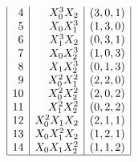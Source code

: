 \begin{table}
$$\begin{array}{|r|r|r|}
4 & X_0^3X_2 & ( 3, 0, 1 )\\
5 & X_0X_1^3 & ( 1, 3, 0 )\\
6 & X_1^3X_2 & ( 0, 3, 1 )\\
7 & X_0X_2^3 & ( 1, 0, 3 )\\
8 & X_1X_2^3 & ( 0, 1, 3 )\\
9 & X_0^2X_1^2 & ( 2, 2, 0 )\\
10 & X_0^2X_2^2 & ( 2, 0, 2 )\\
11 & X_1^2X_2^2 & ( 0, 2, 2 )\\
12 & X_0^2X_1X_2 & ( 2, 1, 1 )\\
13 & X_0X_1^2X_2 & ( 1, 2, 1 )\\
14 & X_0X_1X_2^2 & ( 1, 1, 2 )\\
\hline
\end{array}
$$
\caption{\label{tab:PG2monomials}The partition ordering of monomials of degree $1$, $2,$ $3$ and $4$ in a plane}
\end{table}
